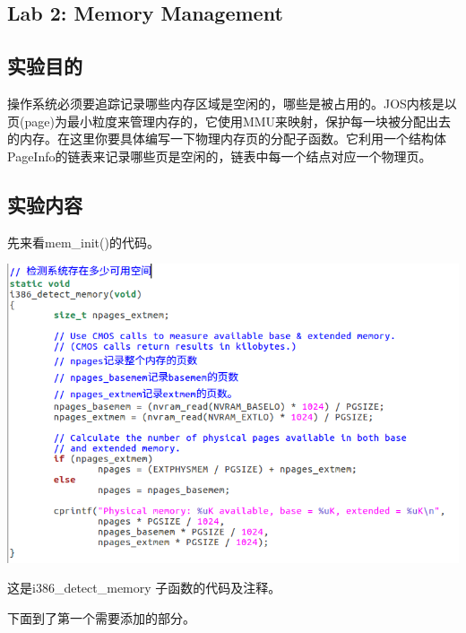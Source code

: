 \begin{ExerciseList}
  \setcounter{Exercise}{0}
  \section{Lab 2: Memory Management}

  \subsection{实验目的}

  操作系统必须要追踪记录哪些内存区域是空闲的，哪些是被占用的。JOS内核是以页(page)为最小粒度来管理内存的，它使用MMU来映射，保护每一块被分配出去的内存。在这里你要具体编写一下物理内存页的分配子函数。它利用一个结构体PageInfo的链表来记录哪些页是空闲的，链表中每一个结点对应一个物理页。

  \subsection{实验内容}


  先来看mem\_init()的代码。

  \includegraphics[width=6in]{figures/lab2/image40.png}

  这是i386\_detect\_memory 子函数的代码及注释。

  下面到了第一个需要添加的部分。


\end{ExerciseList}
